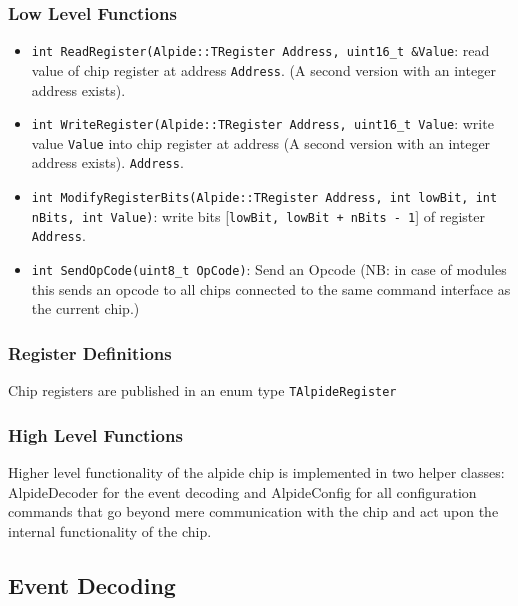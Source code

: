 \documentclass{article}
\begin{document}
\subsubsection {Low Level Functions}

\begin{itemize}
\item \texttt{int ReadRegister(Alpide::TRegister Address, uint16\_t
    \&Value}: \newline read value of chip register at address
  \texttt{Address}. (A second version with an integer address
  exists).
\item \texttt{int WriteRegister(Alpide::TRegister Address, uint16\_t
    Value}: \newline write value \texttt{Value} into chip register at
  address (A second version with an integer address
  exists).
\texttt{Address}.
\item \texttt{int ModifyRegisterBits(Alpide::TRegister Address, int
    lowBit, int nBits, int Value)}: write bits [\texttt{lowBit, lowBit + nBits
  - 1}] of register \texttt{Address}. 
\item \texttt{int SendOpCode(uint8\_t OpCode)}: \newline Send an Opcode
  (NB: in case of modules this sends an opcode to all chips connected
  to the same command interface as the current chip.)
\end{itemize}




\subsubsection {Register Definitions} 

Chip registers are published in an enum type \texttt{TAlpideRegister}

\subsubsection{High Level Functions}

Higher level functionality of the alpide chip is implemented in two
helper classes: AlpideDecoder for the event decoding and
AlpideConfig for all configuration commands that go beyond mere
communication with the chip and act upon the internal functionality of
the chip.


\subsection{Event Decoding}
\end{document}
